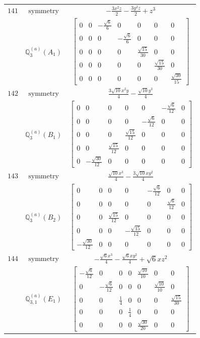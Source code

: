 \documentclass[fleqn,8pt,landscape]{jsarticle}
\begin{document}
\begin{longtable}{ccc}
$ 141 $ & $ \text{symmetry} $ & $ - \frac{3 x^{2} z}{2} - \frac{3 y^{2} z}{2} + z^{3} $ \\
$  $ & $ \mathbb{Q}_{3}^{(a)}(A_{1}) $ & $ \begin{bmatrix} 0 & 0 & - \frac{\sqrt{6}}{6} & 0 & 0 & 0 & 0 \\ 0 & 0 & 0 & - \frac{\sqrt{6}}{6} & 0 & 0 & 0 \\ 0 & 0 & 0 & 0 & \frac{\sqrt{15}}{30} & 0 & 0 \\ 0 & 0 & 0 & 0 & 0 & \frac{\sqrt{15}}{30} & 0 \\ 0 & 0 & 0 & 0 & 0 & 0 & \frac{\sqrt{30}}{15} \end{bmatrix} $ \\ \hline
$ 142 $ & $ \text{symmetry} $ & $ \frac{3 \sqrt{10} x^{2} y}{4} - \frac{\sqrt{10} y^{3}}{4} $ \\
$  $ & $ \mathbb{Q}_{3}^{(a)}(B_{1}) $ & $ \begin{bmatrix} 0 & 0 & 0 & 0 & 0 & - \frac{\sqrt{6}}{12} & 0 \\ 0 & 0 & 0 & 0 & - \frac{\sqrt{6}}{12} & 0 & 0 \\ 0 & 0 & 0 & \frac{\sqrt{15}}{12} & 0 & 0 & 0 \\ 0 & 0 & \frac{\sqrt{15}}{12} & 0 & 0 & 0 & 0 \\ 0 & - \frac{\sqrt{30}}{12} & 0 & 0 & 0 & 0 & 0 \end{bmatrix} $ \\ \hline
$ 143 $ & $ \text{symmetry} $ & $ \frac{\sqrt{10} x^{3}}{4} - \frac{3 \sqrt{10} x y^{2}}{4} $ \\
$  $ & $ \mathbb{Q}_{3}^{(a)}(B_{2}) $ & $ \begin{bmatrix} 0 & 0 & 0 & 0 & - \frac{\sqrt{6}}{12} & 0 & 0 \\ 0 & 0 & 0 & 0 & 0 & \frac{\sqrt{6}}{12} & 0 \\ 0 & 0 & \frac{\sqrt{15}}{12} & 0 & 0 & 0 & 0 \\ 0 & 0 & 0 & - \frac{\sqrt{15}}{12} & 0 & 0 & 0 \\ - \frac{\sqrt{30}}{12} & 0 & 0 & 0 & 0 & 0 & 0 \end{bmatrix} $ \\ \hline
$ 144 $ & $ \text{symmetry} $ & $ - \frac{\sqrt{6} x^{3}}{4} - \frac{\sqrt{6} x y^{2}}{4} + \sqrt{6} x z^{2} $ \\
$  $ & $ \mathbb{Q}_{3,1}^{(a)}(E_{1}) $ & $ \begin{bmatrix} - \frac{\sqrt{6}}{12} & 0 & 0 & 0 & \frac{\sqrt{10}}{10} & 0 & 0 \\ 0 & - \frac{\sqrt{6}}{12} & 0 & 0 & 0 & \frac{\sqrt{10}}{10} & 0 \\ 0 & 0 & \frac{1}{4} & 0 & 0 & 0 & \frac{\sqrt{15}}{30} \\ 0 & 0 & 0 & \frac{1}{4} & 0 & 0 & 0 \\ 0 & 0 & 0 & 0 & \frac{\sqrt{30}}{20} & 0 & 0 \end{bmatrix} $ \\ \hline

\end{longtable}
\end{document}
